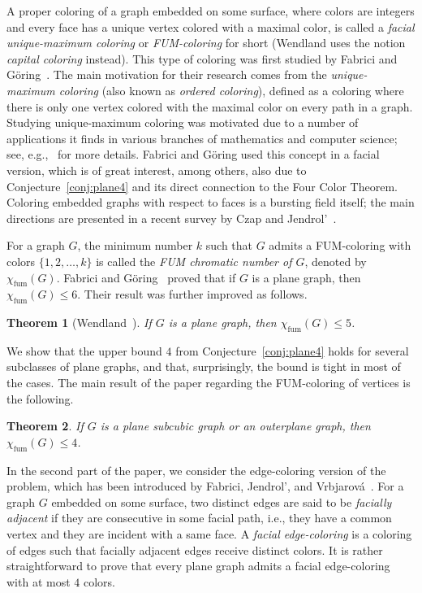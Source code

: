 \documentclass[a4paper,12pt]{article}
\newtheorem{theorem}{Theorem}
\newcommand{\chiC}[1]{\chi_{\mathrm{fum}}(#1)}
\begin{document}
A proper coloring of a graph embedded on some surface, where colors are integers and every face has a unique vertex colored with a maximal color,
is called a \emph{facial unique-maximum coloring} or \emph{FUM-coloring} for short (Wendland uses the notion \emph{capital coloring} instead).
This type of coloring was first studied by Fabrici and G\"{o}ring~\cite{FabGor16}.
The main motivation for their research comes from the \emph{unique-maximum coloring} (also known as \emph{ordered coloring}), defined as a coloring
where there is only one vertex colored with the maximal color on every path in a graph.
Studying unique-maximum coloring was motivated due to a number of applications it finds in various branches of
mathematics and computer science; see, e.g.,~\cite{CheKesPal13,CheTot11,KatMccSea95} for more details.
Fabrici and G\"{o}ring used this concept in a facial version, which is of great interest, among others,
also due to Conjecture~\ref{conj:plane4} and its direct connection to the Four Color Theorem.
Coloring embedded graphs with respect to faces is a bursting field itself; the main directions are presented in a recent survey by Czap and Jendrol'~\cite{CzaJen16}.

For a graph $G$, the minimum number $k$ such that $G$ admits a FUM-coloring
with colors $\{1,2,\ldots,k\}$ is called the \emph{FUM chromatic number of $G$}, denoted by $\chiC{G}$.
Fabrici and G\"{o}ring~\cite{FabGor16} proved that if $G$ is a plane graph, then  $\chiC{G} \leq 6$.
Their result was further improved as follows.
\begin{theorem}[Wendland~\cite{Wen16}]
	\label{thm:plane5}
	If $G$ is a plane graph, then $\chiC{G} \leq 5$.
\end{theorem}

We show that the upper bound $4$ from Conjecture~\ref{conj:plane4} holds for several subclasses of plane graphs, and that,
surprisingly, the bound is tight in most of the cases. The main result of the paper regarding the FUM-coloring of vertices is the following.
\begin{theorem}
	\label{thm:subcubic}
	If $G$ is a plane subcubic graph or an outerplane graph, then $\chiC{G} \leq 4$.
\end{theorem}

In the second part of the paper, we consider the edge-coloring version of the problem,
which has been introduced by Fabrici, Jendrol', and Vrbjarov\'{a}~\cite{FabJenVrb15}.
For a graph $G$ embedded on some surface, two distinct edges are said to be \emph{facially adjacent}
if they are consecutive in some facial path, i.e., they have a common vertex and they are incident with a same face.
A \emph{facial edge-coloring} is a coloring of edges such that facially adjacent edges receive distinct colors.
It is rather straightforward to prove that every plane graph admits a facial edge-coloring with at most $4$ colors.
\end{document}
